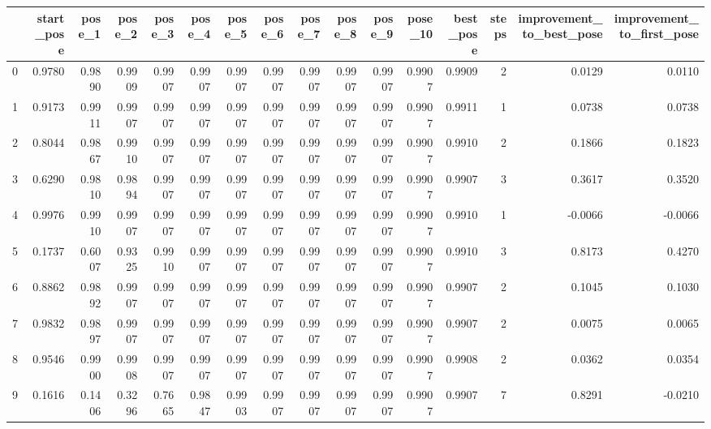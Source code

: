 \begin{tabular}{lrrrrrrrrrrrrrrr}
\toprule
{} &  start\_pose &  pose\_1 &  pose\_2 &  pose\_3 &  pose\_4 &  pose\_5 &  pose\_6 &  pose\_7 &  pose\_8 &  pose\_9 &  pose\_10 &  best\_pose &  steps &  improvement\_to\_best\_pose &  improvement\_to\_first\_pose \\
\midrule
0   &      0.9780 &  0.9890 &  0.9909 &  0.9907 &  0.9907 &  0.9907 &  0.9907 &  0.9907 &  0.9907 &  0.9907 &   0.9907 &     0.9909 &      2 &                    0.0129 &                     0.0110 \\
1   &      0.9173 &  0.9911 &  0.9907 &  0.9907 &  0.9907 &  0.9907 &  0.9907 &  0.9907 &  0.9907 &  0.9907 &   0.9907 &     0.9911 &      1 &                    0.0738 &                     0.0738 \\
2   &      0.8044 &  0.9867 &  0.9910 &  0.9907 &  0.9907 &  0.9907 &  0.9907 &  0.9907 &  0.9907 &  0.9907 &   0.9907 &     0.9910 &      2 &                    0.1866 &                     0.1823 \\
3   &      0.6290 &  0.9810 &  0.9894 &  0.9907 &  0.9907 &  0.9907 &  0.9907 &  0.9907 &  0.9907 &  0.9907 &   0.9907 &     0.9907 &      3 &                    0.3617 &                     0.3520 \\
4   &      0.9976 &  0.9910 &  0.9907 &  0.9907 &  0.9907 &  0.9907 &  0.9907 &  0.9907 &  0.9907 &  0.9907 &   0.9907 &     0.9910 &      1 &                   -0.0066 &                    -0.0066 \\
5   &      0.1737 &  0.6007 &  0.9325 &  0.9910 &  0.9907 &  0.9907 &  0.9907 &  0.9907 &  0.9907 &  0.9907 &   0.9907 &     0.9910 &      3 &                    0.8173 &                     0.4270 \\
6   &      0.8862 &  0.9892 &  0.9907 &  0.9907 &  0.9907 &  0.9907 &  0.9907 &  0.9907 &  0.9907 &  0.9907 &   0.9907 &     0.9907 &      2 &                    0.1045 &                     0.1030 \\
7   &      0.9832 &  0.9897 &  0.9907 &  0.9907 &  0.9907 &  0.9907 &  0.9907 &  0.9907 &  0.9907 &  0.9907 &   0.9907 &     0.9907 &      2 &                    0.0075 &                     0.0065 \\
8   &      0.9546 &  0.9900 &  0.9908 &  0.9907 &  0.9907 &  0.9907 &  0.9907 &  0.9907 &  0.9907 &  0.9907 &   0.9907 &     0.9908 &      2 &                    0.0362 &                     0.0354 \\
9   &      0.1616 &  0.1406 &  0.3296 &  0.7665 &  0.9847 &  0.9903 &  0.9907 &  0.9907 &  0.9907 &  0.9907 &   0.9907 &     0.9907 &      7 &                    0.8291 &                    -0.0210 \\

\end{tabular}
